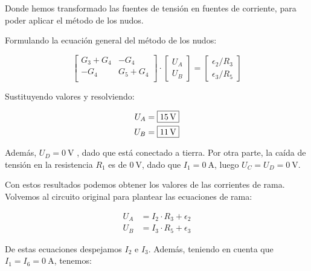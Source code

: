 \documentclass[10pt]{article}
\begin{document}
\vspace{6mm}

Donde hemos transformado las fuentes de tensión en fuentes de corriente, para poder aplicar el método de los nudos.

\vspace{3mm}
Formulando la ecuación general del método de los nudos:

\begin{equation*}
  \begin{bmatrix}
    G_3 + G_4 & -G_4\\
    -G_4 & G_5 + G_4\\
  \end{bmatrix} \cdot %
  \begin{bmatrix}
    U_A\\
    U_B
  \end{bmatrix} = %
  \begin{bmatrix}
    \epsilon_2/R_3\\
    \epsilon_3/R_5
  \end{bmatrix}
\end{equation*}

\vspace{4mm}
Sustituyendo valores y resolviendo:

\vspace{-5mm}
\begin{align*}
  U_A = \; \Aboxed{\qty{15}{\volt}}\\
  U_B = \; \Aboxed{\qty{11}{\volt}}
\end{align*}

Además, $U_D = \boxed{\qty{0}{\volt}}$ , dado que está conectado a tierra. Por otra parte, la caída de tensión en la resistencia $R_1$ es de $\qty{0}{\volt}$, dado que $I_1 = \qty{0}{\ampere}$, luego $U_C = U_D = \boxed{\qty{0}{\volt}}$.

\vspace{4mm}

Con estos resultados podemos obtener los valores de las corrientes de rama. Volvemos al circuito original para plantear las ecuaciones de rama:

\vspace{-4mm}
\begin{align*}
  U_A &= I_2 \cdot R_3 + \epsilon_2\\
  U_B &= I_3 \cdot R_5 + \epsilon_3
\end{align*}

\vspace{2mm}
De estas ecuaciones despejamos $I_2$ e $I_3$. Además, teniendo en cuenta que $I_1 = I_6 = \qty{0}{\ampere}$, tenemos:
\end{document}
